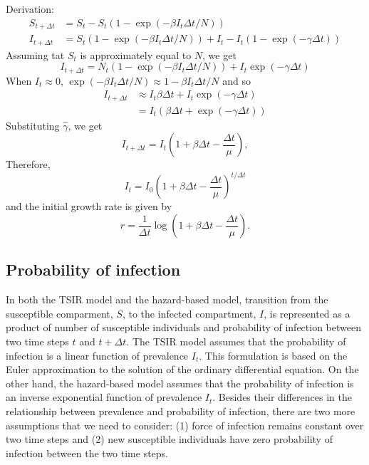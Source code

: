 \documentclass{article}
\begin{document}
Derivation:
\begin{equation}
\begin{aligned}
S_{t+\Delta t} &= S_t - S_t (1- \exp(-\beta I_t \Delta t/N))\\
I_{t+\Delta t} &= S_t (1- \exp(-\beta I_t \Delta t/N)) + I_t - I_t (1- \exp(-\gamma \Delta t))
\end{aligned}
\end{equation}
Assuming tat $S_t$ is approximately equal to $N$, we get
\begin{equation}
I_{t+\Delta t} = N_t (1- \exp(-\beta I_t \Delta t/N)) + I_t \exp(-\gamma \Delta t)
\end{equation}
When $I_t \approx 0$, $\exp(-\beta I_t \Delta t/N) \approx 1 - \beta I_t \Delta t/N$ and so
\begin{equation}
\begin{aligned}
I_{t+\Delta t} &\approx  I_t \beta \Delta t + I_t \exp(-\gamma \Delta t)\\
&= I_t (\beta \Delta t + \exp(-\gamma \Delta t))
\end{aligned}
\end{equation}
Substituting $\hat{\gamma}$, we get
\begin{equation}
I_{t+\Delta t} = I_t \left(1 + \beta \Delta t - \frac{\Delta t}{\mu}\right),
\end{equation}
Therefore,
\begin{equation}
I_{t} = I_0 \left(1 + \beta\Delta t - \frac{\Delta t}{\mu}\right)^{t/\Delta t}
\end{equation}
and the initial growth rate is given by
\begin{equation}
r = \frac{1}{\Delta t} \log \left(1 + \beta \Delta t - \frac{\Delta t}{\mu}\right).
\end{equation}




\subsection{Probability of infection}

In both the TSIR model and the hazard-based model, transition from the susceptible comparment, $S$, to the infected compartment, $I$, is represented as a product of number of susceptible individuals and probability of infection between two time steps $t$ and $t + \Delta t$.
The TSIR model assumes that the probability of infection is a linear function of prevalence $I_t$.
This formulation is based on the Euler approximation to the solution of the ordinary differential equation.
On the other hand, the hazard-based model assumes that the probability of infection is an inverse exponential function of prevalence $I_t$.
Besides their differences in the relationship between prevalence and probability of infection, there are two more assumptions that we need to consider: (1) force of infection remains constant over two time steps and (2) new susceptible individuals have zero probability of infection between the two time steps.
\end{document}
